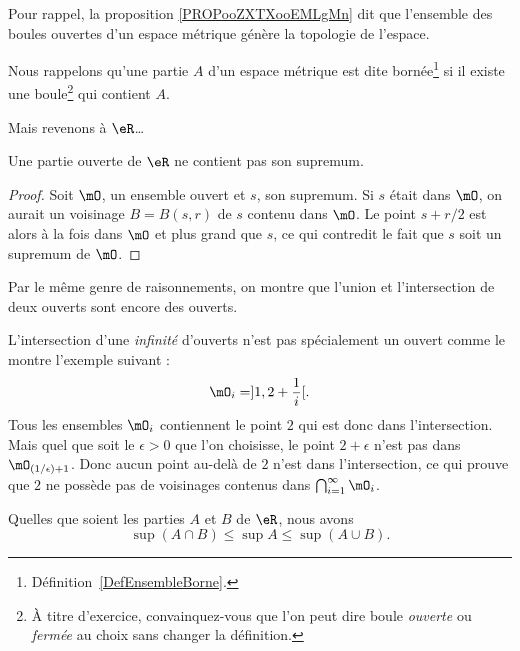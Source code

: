 Pour rappel, la proposition \ref{PROPooZXTXooEMLgMn} dit que l'ensemble des boules ouvertes d'un espace métrique génère la topologie de l'espace.

Nous rappelons qu'une partie $A$ d'un espace métrique est dite bornée\footnote{Définition~\ref{DefEnsembleBorne}.} si il existe une boule\footnote{À titre d'exercice, convainquez-vous que l'on peut dire boule \emph{ouverte} ou \emph{fermée} au choix sans changer la définition.} qui contient $A$.

Mais revenons à \( \eR \)\dots
\begin{lemma}  \label{LemSupOuvPas}
    Une partie ouverte de \( \eR\) ne contient pas son supremum.
\end{lemma}

\begin{proof}
Soit $\mO$, un ensemble ouvert et $s$, son supremum. Si $s$ était dans $\mO$, on aurait un voisinage $B=B(s,r)$ de $s$ contenu dans $\mO$. Le point $s+r/2$ est alors à la fois dans $\mO$ et plus grand que $s$, ce qui contredit le fait que $s$ soit un supremum de $\mO$.
\end{proof}

Par le même genre de raisonnements, on montre que l'union et l'intersection de deux ouverts sont encore des ouverts.

\begin{remark}
L'intersection d'une \emph{infinité} d'ouverts n'est pas spécialement un ouvert comme le montre l'exemple suivant :
\[
  \mO_i=]1,2+\frac{ 1 }{ i }[.
\]
Tous les ensembles $\mO_i$ contiennent le point $2$ qui est donc dans l'intersection. Mais quel que soit le $\epsilon>0$ que l'on choisisse, le point $2+\epsilon$ n'est pas dans $\mO_{(1/\epsilon)+1}$. Donc aucun point au-delà de $2$ n'est dans l'intersection, ce qui prouve que $2$ ne possède pas de voisinages contenus dans $\bigcap_{i=1}^{\infty}\mO_i$.
\end{remark}

\begin{proposition}     \label{PROPooANIOooIJHelX}
    Quelles que soient les parties $A$ et $B$ de $\eR$, nous avons
    \begin{equation}
        \sup(A\cap B)\leq\sup A\leq\sup(A\cup B).
    \end{equation}
\end{proposition}

